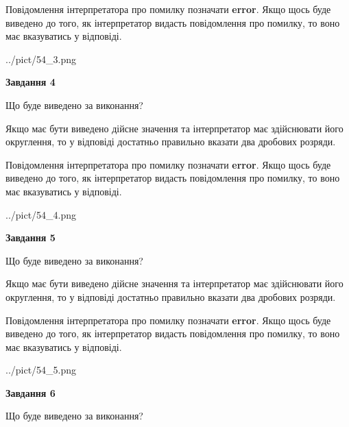 \documentclass[12pt, ukrainian]{article}
\begin{document}
{\begin {Large}
Повідомлення інтерпретатора про помилку позначати \textbf{error}.
Якщо щось буде виведено до того, як інтерпретатор видасть повідомлення про помилку, 
то воно має вказуватись у відповіді. \par

\begin{center}
	{../pict/54_3.png}
\end{center}
\newpage

{\begin {center}\textbf{Завдання 4}\end {center}}\par
Що буде виведено за виконання? \par

Якщо має бути виведено дійсне значення та інтерпретатор має здійснювати його округлення, 
то у відповіді достатньо правильно вказати два дробових розряди.

Повідомлення інтерпретатора про помилку позначати \textbf{error}.
Якщо щось буде виведено до того, як інтерпретатор видасть повідомлення про помилку, 
то воно має вказуватись у відповіді. \par

\begin{center}
	{../pict/54_4.png}
\end{center}
\newpage

{\begin {center}\textbf{Завдання 5}\end {center}}\par
Що буде виведено за виконання? \par

Якщо має бути виведено дійсне значення та інтерпретатор має здійснювати його округлення, 
то у відповіді достатньо правильно вказати два дробових розряди.

Повідомлення інтерпретатора про помилку позначати \textbf{error}.
Якщо щось буде виведено до того, як інтерпретатор видасть повідомлення про помилку, 
то воно має вказуватись у відповіді. \par

\begin{center}
	{../pict/54_5.png}
\end{center}
\newpage

{\begin {center}\textbf{Завдання 6}\end {center}}\par
Що буде виведено за виконання? \par


\end{Large}}
\end{document}
